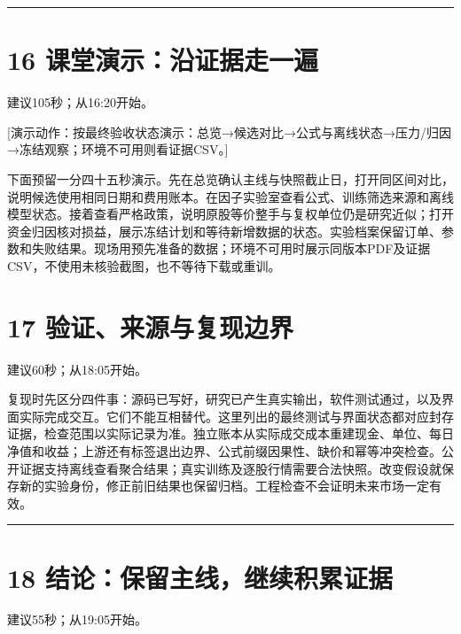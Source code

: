 \documentclass[UTF8,a4paper,12pt]{ctexart}
\begin{document}
\vspace{4mm}\noindent\textcolor{accent!40}{\rule{\textwidth}{0.4pt}}\par

\section*{\color{ink}16  课堂演示：沿证据走一遍}

{\small\color{accent}建议105秒；从16:20开始。}\par

{\small\color{accent}[演示动作：按最终验收状态演示：总览→候选对比→公式与离线状态→压力/归因→冻结观察；环境不可用则看证据CSV。]}\par

下面预留一分四十五秒演示。先在总览确认主线与快照截止日，打开同区间对比，说明候选使用相同日期和费用账本。在因子实验室查看公式、训练筛选来源和离线模型状态。接着查看严格政策，说明原股等价整手与复权单位仍是研究近似；打开资金归因核对损益，展示冻结计划和等待新增数据的状态。实验档案保留订单、参数和失败结果。现场用预先准备的数据；环境不可用时展示同版本PDF及证据CSV，不使用未核验截图，也不等待下载或重训。


\newpage

\section*{\color{ink}17  验证、来源与复现边界}

{\small\color{accent}建议60秒；从18:05开始。}\par

复现时先区分四件事：源码已写好，研究已产生真实输出，软件测试通过，以及界面实际完成交互。它们不能互相替代。这里列出的最终测试与界面状态都对应封存证据，检查范围以实际记录为准。独立账本从实际成交成本重建现金、单位、每日净值和收益；上游还有标签退出边界、公式前缀因果性、缺价和幂等冲突检查。公开证据支持离线查看聚合结果；真实训练及逐股行情需要合法快照。改变假设就保存新的实验身份，修正前旧结果也保留归档。工程检查不会证明未来市场一定有效。


\vspace{4mm}\noindent\textcolor{accent!40}{\rule{\textwidth}{0.4pt}}\par

\section*{\color{ink}18  结论：保留主线，继续积累证据}

{\small\color{accent}建议55秒；从19:05开始。}\par
\end{document}
